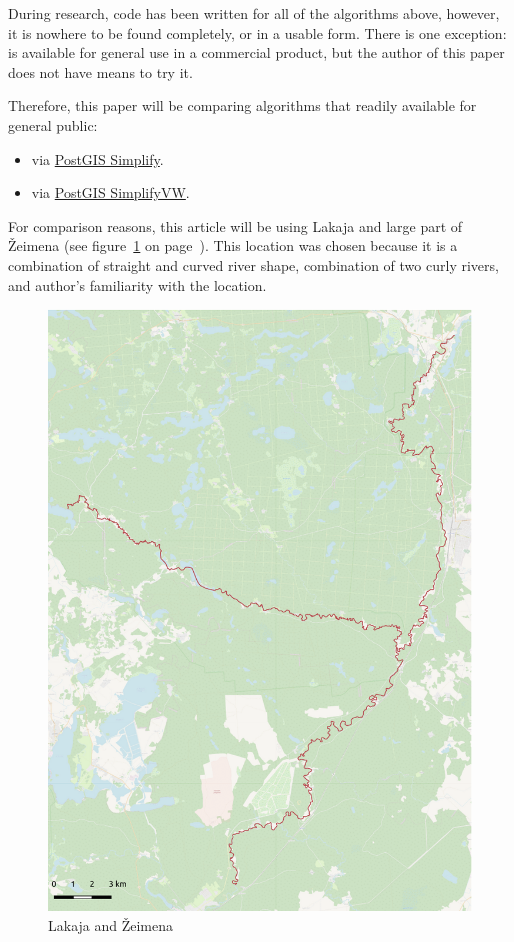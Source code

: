 \documentclass{article}
\begin{document}
During research, code has been written for all of the algorithms above,
however, it is nowhere to be found completely, or in a usable form. There is
one exception: \cite{wang1998line} is available for general use in a commercial
product, but the author of this paper does not have means to try it.

Therefore, this paper will be comparing algorithms that readily available for
general public:
\begin{itemize}
    \item \cite{douglas1973algorithms} via
        \href{https://postgis.net/docs/ST_Simplify.html}{PostGIS Simplify}.

    \item \cite{visvalingam1993line} via
        \href{https://postgis.net/docs/ST_SimplifyVW.html}{PostGIS SimplifyVW}.
\end{itemize}

For comparison reasons, this article will be using Lakaja and large part of Žeimena
(see figure~\ref{fig:zeimena} on page~\pageref{fig:zeimena}). This location was
chosen because it is a combination of straight and curved river shape,
combination of two curly rivers, and author's familiarity with the location.

\begin{figure}
    \centering
    \includegraphics[width=148mm]{zeimena-pretty}
    \caption{Lakaja and Žeimena}
    \label{fig:zeimena}
\end{figure}
\end{document}
